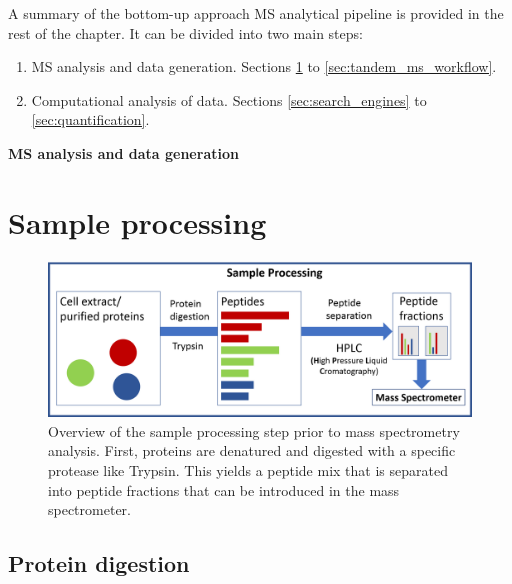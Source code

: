 \documentclass[11pt, a4paper]{report}
\begin{document}
A summary of the bottom-up approach MS analytical pipeline is provided in the rest of the chapter. It can be divided into two main steps:

\begin{enumerate}

\item \ac{MS} analysis and data generation. Sections \ref{sec:sample_processing} to \ref{sec:tandem_ms_workflow}.

\item Computational analysis of data. Sections \ref{sec:search_engines} to \ref{sec:quantification}.

\end{enumerate}

\LARGE
\textbf{MS analysis and data generation}
\normalsize

\section{Sample processing}
\label{sec:sample_processing}

\begin{figure}[!h]
\includegraphics[width=\textwidth]{sample_processing}
\caption{Overview of the sample processing step prior to mass spectrometry analysis. First, proteins are denatured and digested with a specific protease like Trypsin. This yields a peptide mix that is separated into peptide fractions that can be introduced in the mass spectrometer.}
\label{fig:sample_processing}
\end{figure}

\subsection{Protein digestion}
\label{subsec:protein_digestion}
\end{document}
